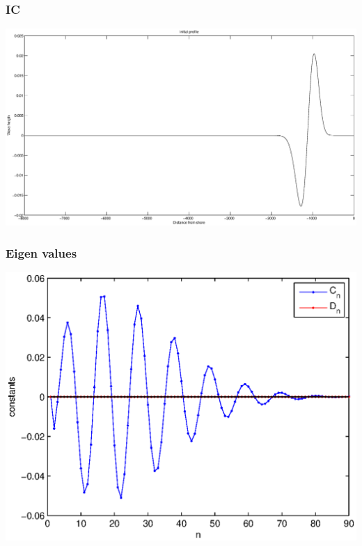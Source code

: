 



\begin{frame}
		\frametitle{IC}
		\includegraphics[width=\textwidth]{IC.eps}
		\end{frame}

\begin{frame}
		\frametitle{Eigen values}
		\includegraphics[width=\textwidth]{Const.eps}
		\end{frame}

	
	
